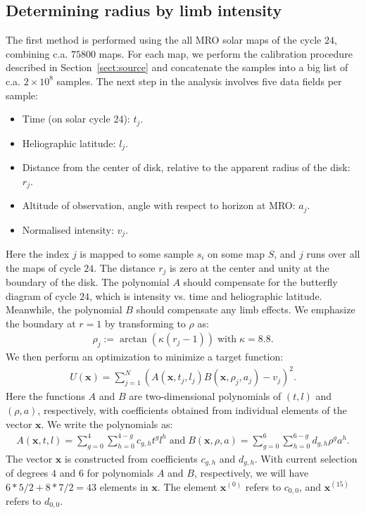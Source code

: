 \documentclass{aa}
\newcommand{\eqnl}[2]{\begin{eqnarray}\label{#1}#2\end{eqnarray}}
\begin{document}
  \subsection{Determining radius by limb intensity} \label{sect:radius_method1}

  The first method is performed using the all MRO solar maps of the cycle $24$, combining c.a. $75800$ maps. For each 
  map, we perform the calibration procedure described in Section~\ref{sect:source} and concatenate the samples into a 
  big list of c.a. $2 \times 10^8$ samples. The next step in the analysis involves five data fields per sample:
  \begin{itemize}
  \item Time (on solar cycle 24): $t_j$.
  \item Heliographic latitude: $l_j$.
  \item Distance from the center of disk, relative to the apparent radius of the disk: $r_j$.
  \item Altitude of observation, angle with respect to horizon at MRO: $a_j$.
  \item Normalised intensity: $v_j$.
  \end{itemize}

  Here the index $j$ is mapped to some sample $s_i$ on some map $S$, and $j$ runs over all the maps of cycle $24$. The 
  distance $r_j$ is zero at the center and unity at the boundary of the disk.
    The polynomial $A$ should compensate for the butterfly diagram of cycle $24$, which is intensity vs. time and heliographic latitude. Meanwhile, the polynomial $B$ should compensate any limb effects.
  We emphasize the boundary at $r=1$ by transforming to $\rho$ as:
  \eqnl{physical_radius_trans}{
  \rho_j := \arctan \left( \kappa \left( r_j - 1 \right)\right) \; \text{with} \; \kappa = 8.8 \text{.}
  }
  We then perform an optimization to 
  minimize a target function:
  \eqnl{physical_radius_target}{
  U(\bm{x}) = \sum \limits_{j=1}^{N} \left( A(\bm{x},t_j,l_j) B(\bm{x},\rho_j,a_j) - v_j \right)^2 \text{.}
  }
  Here the functions $A$ and $B$ are two-dimensional polynomials of $(t,l)$ and $(\rho,a)$, respectively, with coefficients obtained from individual elements of the vector $\bm{x}$. We write the polynomials as:
  \eqnl{physical_radius_polynomials}{
  A(\bm{x},t,l) = \sum \limits_{g=0}^{4} \sum \limits_{h=0}^{4-g} c_{g,h} t^g l^h \; \text{and} \;
  B(\bm{x},\rho,a) = \sum \limits_{g=0}^{6} \sum \limits_{h=0}^{6-g} d_{g,h} \rho^g a^h \text{.}
  }
  The vector $\bm{x}$ is constructed from coefficients $c_{g,h}$ and $d_{g,h}$. With current selection of degrees $4$ 
  and $6$ for polynomials $A$ and $B$, respectively, we will have $6*5/2 + 8*7/2 = 43$ elements in $\bm{x}$. The element 
  $\bm{x}^{(0)}$ refers to $c_{0,0}$, and $\bm{x}^{(15)}$ refers to $d_{0,0}$.
\end{document}
